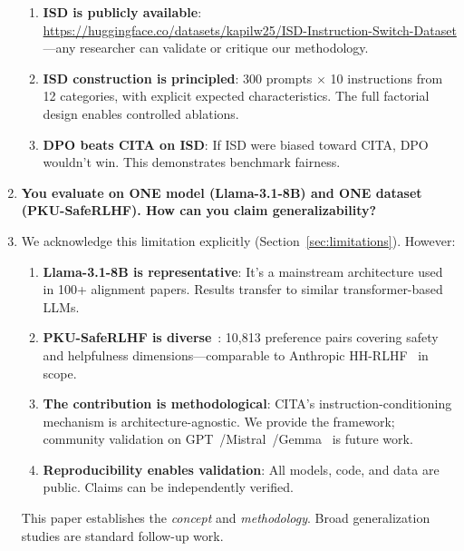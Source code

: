 \begin{enumerate}[label=\textbf{Q\arabic*.}, leftmargin=*, itemsep=8pt]
\begin{enumerate}[leftmargin=*,itemsep=2pt]
    \item \textbf{ISD is publicly available}: \url{https://huggingface.co/datasets/kapilw25/ISD-Instruction-Switch-Dataset}---any researcher can validate or critique our methodology.

    \item \textbf{ISD construction is principled}: 300 prompts $\times$ 10 instructions from 12 categories, with explicit expected characteristics. The full factorial design enables controlled ablations.

    \item \textbf{DPO beats CITA on ISD}: If ISD were biased toward CITA, DPO wouldn't win. This demonstrates benchmark fairness.
\end{enumerate}

\vspace{4mm}

\item[\ding{93}] \textbf{You evaluate on ONE model (Llama-3.1-8B) and ONE dataset (PKU-SafeRLHF). How can you claim generalizability?}

\item[\ding{224}] We acknowledge this limitation explicitly (Section~\ref{sec:limitations}). However:

\begin{enumerate}[leftmargin=*,itemsep=2pt]
    \item \textbf{Llama-3.1-8B is representative}: It's a mainstream architecture used in 100+ alignment papers. Results transfer to similar transformer-based LLMs.

    \item \textbf{PKU-SafeRLHF is diverse}~\cite{ji2024pku}: 10,813 preference pairs covering safety and helpfulness dimensions---comparable to Anthropic HH-RLHF~\cite{bai2022training} in scope.

    \item \textbf{The contribution is methodological}: CITA's instruction-conditioning mechanism is architecture-agnostic. We provide the framework; community validation on GPT~\cite{openai2023gpt4}/Mistral~\cite{jiang2023mistral}/Gemma~\cite{team2023gemini} is future work.

    \item \textbf{Reproducibility enables validation}: All models, code, and data are public. Claims can be independently verified.
\end{enumerate}

This paper establishes the \textit{concept} and \textit{methodology}. Broad generalization studies are standard follow-up work.


\end{enumerate}

